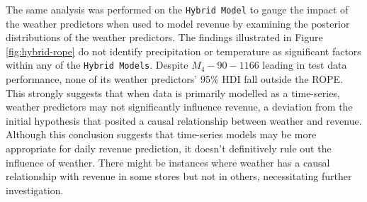 The same analysis was performed on the \texttt{Hybrid Model} to gauge the
impact of the weather predictors when used to model revenue by examining the
posterior distributions of the weather predictors. 
The findings illustrated in Figure \ref{fig:hybrid-rope} do not identify
precipitation or temperature as significant factors within any of the
\texttt{Hybrid Models}. Despite $M_4{-}90{-}1166$ leading in test data
performance, none of its weather predictors' 95\% HDI fall outside the ROPE.
This strongly suggests that when data is primarily modelled as a time-series,
weather predictors may not significantly influence revenue, a deviation from
the initial hypothesis that posited a causal relationship between weather and
revenue. Although this conclusion suggests that time-series models may be more
appropriate for daily revenue prediction, it doesn't definitively rule out the
influence of weather. There might be instances where weather has a causal
relationship with revenue in some stores but not in others, necessitating
further investigation.
